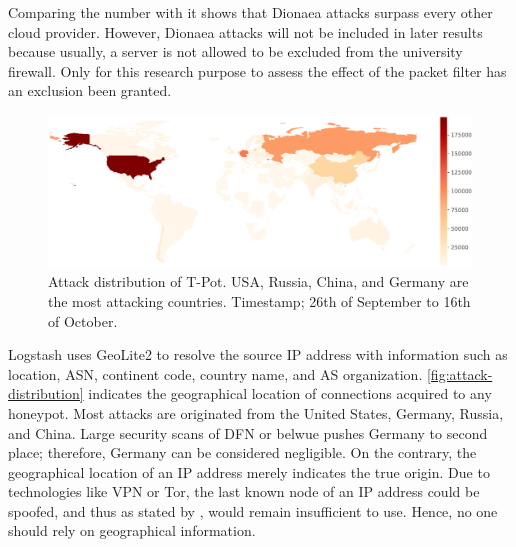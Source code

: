 Comparing the number with \citet{Kelly2021} it shows that Dionaea attacks surpass every other cloud provider.
However, Dionaea attacks will not be included in later results because usually, a server is not allowed to be excluded from the university firewall.
Only for this research purpose to assess the effect of the packet filter has an exclusion been granted.

\begin{figure}[ht]
    \centering
    \includegraphics[width=\textwidth]{figures/tpot-overview-map.pdf}
    \caption[Attack distribution of T-Pot]{
        Attack distribution of T-Pot. USA, Russia, China, and Germany are the most attacking countries.
        Timestamp; 26th of September to 16th of October.
    }
    \label{fig:attack-distribution}
\end{figure}

Logstash uses GeoLite2 to resolve the source IP address with information such as location, ASN, continent code, country name, and AS organization.
\autoref{fig:attack-distribution} indicates the geographical location of connections acquired to any honeypot.
Most attacks are originated from the United States, Germany, Russia, and China.
Large security scans of DFN or \ac{belwue} pushes Germany to second place; therefore, Germany can be considered negligible.
On the contrary, the geographical location of an IP address merely indicates the true origin.
Due to technologies like VPN or Tor, the last known node of an IP address could be spoofed, and thus as stated by \citet{Kelly2021}, would remain insufficient to use.
Hence, no one should rely on geographical information.

